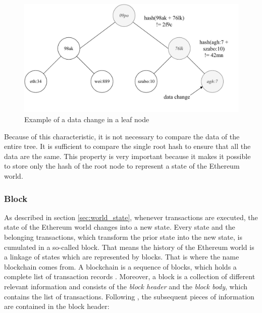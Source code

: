 \begin{figure}[htbp]
	\centering
	\includegraphics[width=.8\linewidth]{./figures/merkle_tree_change.pdf}
	\caption{Example of a data change in a leaf node}
	\label{figure:merkle_tree_change}
\end{figure}

Because of this characteristic, it is not necessary to compare the data of the entire tree. 
It is sufficient to compare the single root hash to ensure that all the data are the same. 
This property is very important because it makes it possible to store only the hash of 
the root node to represent a state of the Ethereum world. 

\subsubsection{Block} 
\label{sec:block}
As described in section \ref{sec:world_state}, whenever transactions are executed, 
the state of the Ethereum world changes into a new state. 
Every state and the belonging transactions, which transform the prior state into 
the new state, is cumulated in a so-called block. 
That means the history of the Ethereum world is a linkage of states which are represented by blocks.
That is where the name blockchain comes from. A blockchain is a sequence 
of blocks, which holds a complete list of transaction records . 
Moreover, a block is a collection of different relevant information and 
consists of the \textit{block header} and the \textit{block body}, 
which contains the list of transactions. Following , 
the subsequent pieces of information are contained in the block header:

